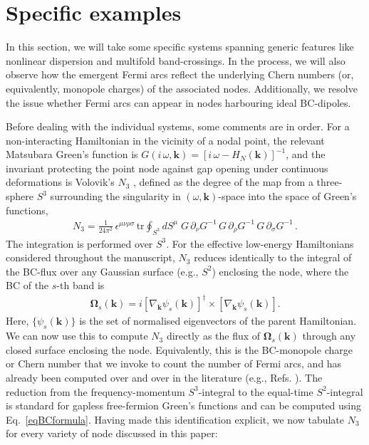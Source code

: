\documentclass[aps,prb,onecolumn, footinbib, 10pt]{revtex4-2}
\begin{document}
\section{Specific examples}
\label{secex}

In this section, we will take some specific systems spanning generic features like nonlinear dispersion and multifold band-crossings. In the process, we will also observe how the emergent Fermi arcs reflect the underlying Chern numbers (or, equivalently, monopole charges) of the associated nodes. Additionally, we resolve the issue whether Fermi arcs can appear in nodes harbouring ideal BC-dipoles.

Before dealing with the individual systems, some comments are in order. For a non-interacting Hamiltonian in the vicinity of a nodal point, the relevant Matsubara Green's function is $G( i \, \omega,\boldsymbol{k})=[ i \, \omega - H_N(\boldsymbol{k})]^{-1}$, and the invariant protecting the point node against gap opening under continuous deformations is Volovik's $N_3$ \cite{volovik-book}, defined as the degree of the map from a three-sphere $S^3$ surrounding the singularity in $(\omega,\boldsymbol{k})$-space into the space of Green's functions,
\begin{align}
N_3 = \frac{1}{24\pi^2}\, \epsilon^{\mu\nu\rho\sigma}\, \mathrm{tr} \oint_{S^3} dS^\mu\; G\, \partial_\nu G^{-1}\, G\, \partial_\rho G^{-1}\, G\, \partial_\sigma G^{-1}\,.
\end{align}
The integration is performed over $S^3$.
For the effective low-energy Hamiltonians considered throughout the manuscript, $N_3$ reduces identically to the integral of the BC-flux over any Gaussian surface (e.g., $S^2$) enclosing the node, where the BC of the $s$-th band is
\begin{align}
\label{eqBCformula}
\boldsymbol{\Omega}_{s}(\boldsymbol{k}) = i\left[\nabla_{\boldsymbol{k}}\psi_{s}(\boldsymbol{k})\right]^\dagger \times \left[\nabla_{\boldsymbol{k}}\psi_{s}(\boldsymbol{k})\right].
\end{align}
Here, $\{ \psi_{s}(\boldsymbol{k}) \}$ is the set of normalised eigenvectors of the parent Hamiltonian. We can now use this to compute $N_3$ directly as the flux of $\boldsymbol{\Omega}_{s}(\boldsymbol{k})$ through any closed surface enclosing the node. Equivalently, this is the BC-monopole charge or Chern number that we invoke to count the number of Fermi arcs, and has already been computed over and over in the literature (e.g., Refs. \cite{ips-ruiz, ips-tilted, ips-cd1, ips-rsw-ph, ips-shreya, ips-internode, ips-spin1-ph, ips-exact-spin1, ips-exact-rsw, ips-nonlin-dipole}). The reduction from the frequency-momentum $S^3$-integral to the equal-time $S^2$-integral is standard for gapless free-fermion Green's functions and can be computed using Eq.~\eqref{eqBCformula}. Having made this identification explicit, we now tabulate $N_3$ for every variety of node discussed in this paper:
\end{document}
